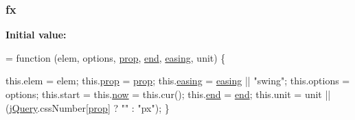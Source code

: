 \subsubsection[{\texorpdfstring{fx}{fx}}]{ fx}\hypertarget{jquery-2_82_81-vsdoc_8js_afbcf56cb9545c8bc885722b4fe4253ce}{}\label{jquery-2_82_81-vsdoc_8js_afbcf56cb9545c8bc885722b4fe4253ce}
{\bfseries Initial value\+:}
\begin{DoxyCode}
= \textcolor{keyword}{function} (elem, options, \hyperlink{jquery-2_82_81-vsdoc_8js_af17be84954030af6c2286f5da385d41b}{prop}, \hyperlink{jquery-2_82_81-vsdoc_8js_af2ce7c86b4e6e9d61f85745258f4ef32}{end}, \hyperlink{jquery-2_82_81-vsdoc_8js_a9758a312629fa6de1744280dd6e6253b}{easing}, unit) \{

        this.elem = elem;
        this.\hyperlink{jquery-2_82_81-vsdoc_8js_af17be84954030af6c2286f5da385d41b}{prop} = \hyperlink{jquery-2_82_81-vsdoc_8js_af17be84954030af6c2286f5da385d41b}{prop};
        this.\hyperlink{jquery-2_82_81-vsdoc_8js_a9758a312629fa6de1744280dd6e6253b}{easing} = \hyperlink{jquery-2_82_81-vsdoc_8js_a9758a312629fa6de1744280dd6e6253b}{easing} || \textcolor{stringliteral}{"swing"};
        this.options = options;
        this.start = this.\hyperlink{jquery-2_82_81-vsdoc_8js_a1ecd248e0e501ce89712536174fdc6e3}{now} = this.cur();
        this.\hyperlink{jquery-2_82_81-vsdoc_8js_af2ce7c86b4e6e9d61f85745258f4ef32}{end} = \hyperlink{jquery-2_82_81-vsdoc_8js_af2ce7c86b4e6e9d61f85745258f4ef32}{end};
        this.unit = unit || (\hyperlink{jquery-2_82_81-vsdoc_8js_add5237586d970a38a81f990e8eb28c6c}{jQuery}.cssNumber[\hyperlink{jquery-2_82_81-vsdoc_8js_af17be84954030af6c2286f5da385d41b}{prop}] ? \textcolor{stringliteral}{""} : \textcolor{stringliteral}{"px"});
    \}
\end{DoxyCode}
